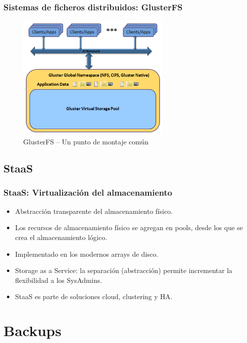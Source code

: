\documentclass{beamer}
\begin{document}
\begin{frame}
  \frametitle{Sistemas de ficheros distribuidos: GlusterFS}
\vspace{-0.25cm}
\begin{figure}[h]
\begin{center}
  \includegraphics[width=7.5cm]{figs/diagram-glusterfs.png}
  \caption{GlusterFS -- Un punto de montaje común}
\end{center}
\end{figure}

\end{frame}


\subsection{StaaS}
\begin{frame}
  \frametitle{StaaS: Virtualización del almacenamiento}
  \begin{itemize}
    \item Abstracción transparente del almacenamiento físico.
    \item Los recursos de almacenamiento físico se agregan en \alert{pools}, desde los que se crea el almacenamiento lógico.
    \item Implementado en los modernos arrays de disco.
    \item \alert{Storage as a Service}: la separación (abstracción) permite incrementar la flexibilidad a los SysAdmins. 
    \item StaaS es parte de soluciones \alert{cloud}, \alert{clustering} y \alert{HA}.
  \end{itemize}
\end{frame}



\section{Backups}
\end{document}
